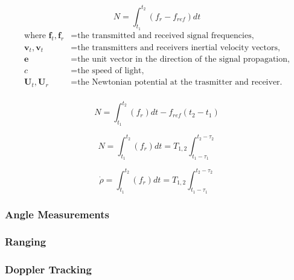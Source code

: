 \begin{equation}
    N = \int_{t_1}^{t_2}(f_r-f_{ref})dt
\end{equation}
\begin{equation*}
    \begin{aligned}
        \textrm{where  }
        \mathbf{f}_t, \mathbf{f}_r &= \textrm{the transmitted and received signal frequencies,}\\
        \mathbf{v}_t, \mathbf{v}_t &= \textrm{the transmitters and receivers inertial velocity vectors,}\\
        \mathbf{e} &= \textrm{the unit vector in the direction of the signal propagation,}\\
        c &= \textrm{the speed of light,}\\
        \mathbf{U}_t, \mathbf{U}_r &= \textrm{the Newtonian potential at the trasmitter and receiver.}\\
    \end{aligned}
\end{equation*}

\begin{equation}
    N = \int_{t_1}^{t_2}(f_r)dt-f_{ref}(t_2-t_1)
\end{equation}

\begin{equation}
    N = \int_{t_1}^{t_2}(f_r)dt = T_{1,2}\int_{t_1-\tau_1}^{t_2-\tau_2}
\end{equation}

\begin{equation}
    \dot{\rho} = \int_{t_1}^{t_2}(f_r)dt = T_{1,2}\int_{t_1-\tau_1}^{t_2-\tau_2}
\end{equation}

\subsubsection{Angle Measurements}

\subsubsection{Ranging}

\subsubsection{Doppler Tracking}

